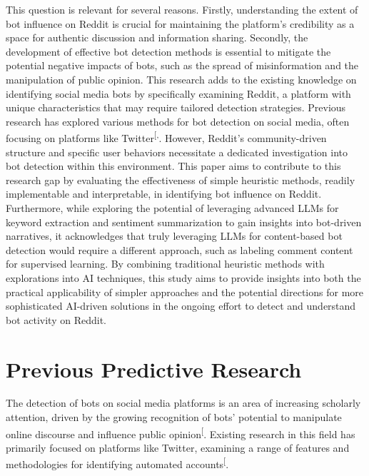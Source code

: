\documentclass[
  12pt,
  letterpaper,
  DIV=11,
  numbers=noendperiod]{scrartcl}
\begin{document}
This question is relevant for several reasons. Firstly, understanding
the extent of bot influence on Reddit is crucial for maintaining the
platform's credibility as a space for authentic discussion and
information sharing. Secondly, the development of effective bot
detection methods is essential to mitigate the potential negative
impacts of bots, such as the spread of misinformation and the
manipulation of public opinion. This research adds to the existing
knowledge on identifying social media bots by specifically examining
Reddit, a platform with unique characteristics that may require tailored
detection strategies. Previous research has explored various methods for
bot detection on social media, often focusing on platforms like
Twitter\textsuperscript{{[},\citeproc{ref-multibotdetector}{4}{]}}.
However, Reddit's community-driven structure and specific user behaviors
necessitate a dedicated investigation into bot detection within this
environment. This paper aims to contribute to this research gap by
evaluating the effectiveness of simple heuristic methods, readily
implementable and interpretable, in identifying bot influence on Reddit.
Furthermore, while exploring the potential of leveraging advanced LLMs
for keyword extraction and sentiment summarization to gain insights into
bot-driven narratives, it acknowledges that truly leveraging LLMs for
content-based bot detection would require a different approach, such as
labeling comment content for supervised learning. By combining
traditional heuristic methods with explorations into AI techniques, this
study aims to provide insights into both the practical applicability of
simpler approaches and the potential directions for more sophisticated
AI-driven solutions in the ongoing effort to detect and understand bot
activity on Reddit.

\section{Previous Predictive
Research}\label{previous-predictive-research}

The detection of bots on social media platforms is an area of increasing
scholarly attention, driven by the growing recognition of bots'
potential to manipulate online discourse and influence public
opinion\textsuperscript{{[}\citeproc{ref-multibotdetector}{4}{]}}.
Existing research in this field has primarily focused on platforms like
Twitter, examining a range of features and methodologies for identifying
automated
accounts\textsuperscript{{[}\citeproc{ref-redditbotwatch}{3}{]}}.
\end{document}
